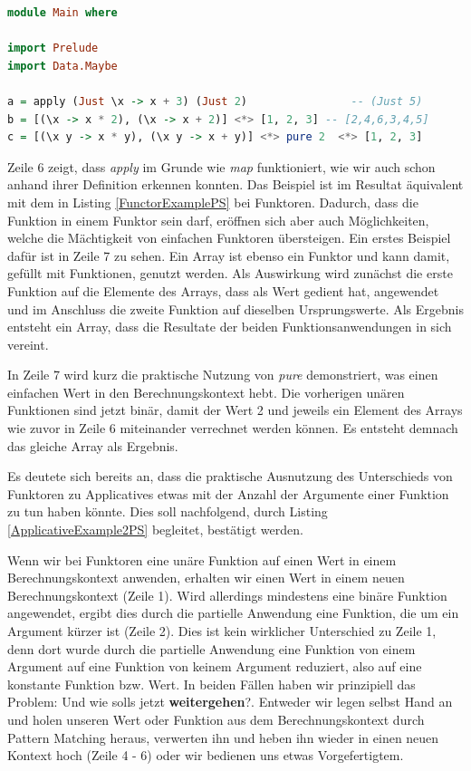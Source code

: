 \documentclass[
12pt,
ngerman,
oneside]
{scrbook} %
\begin{document}
\begin{lstlisting}[language=purescript, style=numbered-and-boxed, caption=Beispiel mit Applicatives in PS, label=ApplicativeExamplePS]
module Main where

import Prelude
import Data.Maybe

a = apply (Just \x -> x + 3) (Just 2) 			  	 -- (Just 5)
b = [(\x -> x * 2), (\x -> x + 2)] <*> [1, 2, 3] -- [2,4,6,3,4,5]
c = [(\x y -> x * y), (\x y -> x + y)] <*> pure 2  <*> [1, 2, 3]
\end{lstlisting}

Zeile 6 zeigt, dass \emph{apply} im Grunde wie \emph{map} funktioniert, wie wir auch schon anhand ihrer Definition erkennen konnten. Das Beispiel ist im Resultat äquivalent mit dem in Listing \ref{FunctorExamplePS} bei Funktoren. Dadurch, dass die Funktion in einem Funktor sein darf, eröffnen sich aber auch Möglichkeiten, welche die Mächtigkeit von einfachen Funktoren übersteigen. Ein erstes Beispiel dafür ist in Zeile 7 zu sehen. Ein Array ist ebenso ein Funktor und kann damit, gefüllt mit Funktionen, genutzt werden. Als Auswirkung wird zunächst die erste Funktion auf die Elemente des Arrays, dass als Wert gedient hat, angewendet und im Anschluss die zweite Funktion auf dieselben Ursprungswerte. Als Ergebnis entsteht ein Array, dass die Resultate der beiden Funktionsanwendungen in sich vereint. 

In Zeile 7 wird kurz die praktische Nutzung von \emph{pure} demonstriert, was einen einfachen Wert in den Berechnungskontext hebt. Die vorherigen unären Funktionen sind jetzt binär, damit der Wert 2 und jeweils ein Element des Arrays wie zuvor in Zeile 6 miteinander verrechnet werden können. Es entsteht demnach das gleiche Array als Ergebnis.

Es deutete sich bereits an, dass die praktische Ausnutzung des Unterschieds von Funktoren zu Applicatives etwas mit der Anzahl der Argumente einer Funktion zu tun haben könnte. Dies soll nachfolgend, durch Listing \ref{ApplicativeExample2PS} begleitet, bestätigt werden.

Wenn wir bei Funktoren eine unäre Funktion auf einen Wert in einem Berechnungskontext anwenden, erhalten wir einen Wert in einem neuen Berechnungskontext (Zeile 1). Wird allerdings mindestens eine binäre Funktion angewendet, ergibt dies durch die partielle Anwendung eine Funktion, die um ein Argument kürzer ist (Zeile 2). Dies ist kein wirklicher Unterschied zu Zeile 1, denn dort wurde durch die partielle Anwendung eine Funktion von einem Argument auf eine Funktion von keinem Argument reduziert, also auf eine konstante Funktion bzw. Wert. In beiden Fällen haben wir prinzipiell das Problem: \glqq Und wie solls jetzt \textbf{weitergehen}?\grqq{}. Entweder wir legen selbst Hand an und holen unseren Wert oder Funktion aus dem Berechnungskontext durch Pattern Matching heraus, verwerten ihn und heben ihn wieder in einen neuen Kontext hoch (Zeile 4 - 6) oder wir bedienen uns etwas Vorgefertigtem. 
\end{document}
